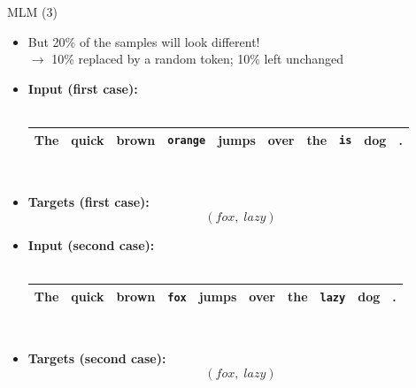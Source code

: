 \documentclass[11pt,compress,t,notes=noshow, xcolor=table]{beamer}
\begin{document}

\begin{frame}{MLM (3)}

\begin{itemize}
\item \warning But 20\% of the samples will look different!\\
			$\to$ 10\% replaced by a random token; 10\% left unchanged
\item \normalsize \textbf{Input (first case):}\\\mbox{}\\
			\footnotesize
\begin{tabular}{|cccccccccc|}
\hline
The & quick & brown & \cellcolor{blue!65}\texttt{orange} & jumps & over & the & \cellcolor{blue!65}\texttt{is} & dog & . \\
\hline
\end{tabular}\\\mbox{}
\item \normalsize \textbf{Targets (first case):} $$(fox,\; lazy)$$
\item \normalsize \textbf{Input (second case):}\\\mbox{}\\
			\footnotesize
\begin{tabular}{|cccccccccc|}
\hline
The & quick & brown & \cellcolor{blue!65}\texttt{fox} & jumps & over & the & \cellcolor{blue!65}\texttt{lazy} & dog & . \\
\hline
\end{tabular}\\\mbox{}
\item \normalsize \textbf{Targets (second case):} $$(fox,\; lazy)$$
\end{itemize}

\end{frame}
\end{document}
